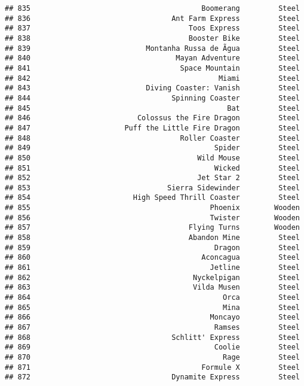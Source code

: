 \documentclass[
]{article}
\begin{document}
\begin{verbatim}
## 835                                        Boomerang         Steel
## 836                                 Ant Farm Express         Steel
## 837                                     Toos Express         Steel
## 838                                     Booster Bike         Steel
## 839                           Montanha Russa de Ãgua         Steel
## 840                                  Mayan Adventure         Steel
## 841                                   Space Mountain         Steel
## 842                                            Miami         Steel
## 843                           Diving Coaster: Vanish         Steel
## 844                                 Spinning Coaster         Steel
## 845                                              Bat         Steel
## 846                         Colossus the Fire Dragon         Steel
## 847                      Puff the Little Fire Dragon         Steel
## 848                                   Roller Coaster         Steel
## 849                                           Spider         Steel
## 850                                       Wild Mouse         Steel
## 851                                           Wicked         Steel
## 852                                       Jet Star 2         Steel
## 853                                Sierra Sidewinder         Steel
## 854                        High Speed Thrill Coaster         Steel
## 855                                          Phoenix        Wooden
## 856                                          Twister        Wooden
## 857                                     Flying Turns        Wooden
## 858                                     Abandon Mine         Steel
## 859                                           Dragon         Steel
## 860                                        Aconcagua         Steel
## 861                                          Jetline         Steel
## 862                                      Nyckelpigan         Steel
## 863                                      Vilda Musen         Steel
## 864                                             Orca         Steel
## 865                                             Mina         Steel
## 866                                          Moncayo         Steel
## 867                                           Ramses         Steel
## 868                                 Schlitt' Express         Steel
## 869                                           Coolie         Steel
## 870                                             Rage         Steel
## 871                                        Formule X         Steel
## 872                                 Dynamite Express         Steel

\end{verbatim}
\end{document}
